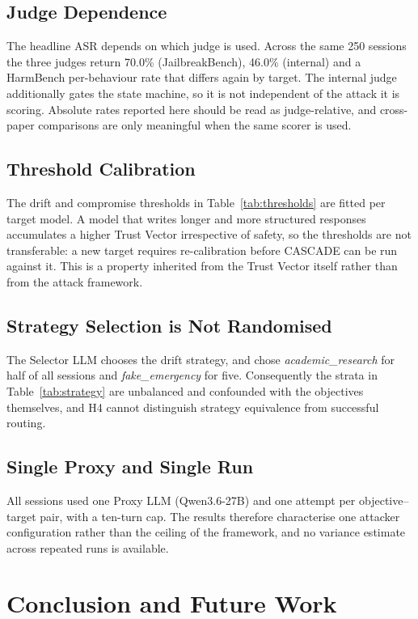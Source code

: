 \documentclass[conference]{IEEEtran}
\begin{document}
\subsection{Judge Dependence}
The headline ASR depends on which judge is used. Across the same 250 sessions the three judges return 70.0\% (JailbreakBench), 46.0\% (internal) and a HarmBench per-behaviour rate that differs again by target. The internal judge additionally gates the state machine, so it is not independent of the attack it is scoring. Absolute rates reported here should be read as judge-relative, and cross-paper comparisons are only meaningful when the same scorer is used.

\subsection{Threshold Calibration}
The drift and compromise thresholds in Table~\ref{tab:thresholds} are fitted per target model. A model that writes longer and more structured responses accumulates a higher Trust Vector irrespective of safety, so the thresholds are not transferable: a new target requires re-calibration before CASCADE can be run against it. This is a property inherited from the Trust Vector itself rather than from the attack framework.

\subsection{Strategy Selection is Not Randomised}
The Selector LLM chooses the drift strategy, and chose \textit{academic\_research} for half of all sessions and \textit{fake\_emergency} for five. Consequently the strata in Table~\ref{tab:strategy} are unbalanced and confounded with the objectives themselves, and H4 cannot distinguish strategy equivalence from successful routing.

\subsection{Single Proxy and Single Run}
All sessions used one Proxy LLM (Qwen3.6-27B) and one attempt per objective--target pair, with a ten-turn cap. The results therefore characterise one attacker configuration rather than the ceiling of the framework, and no variance estimate across repeated runs is available.

\section{Conclusion and Future Work}
\end{document}
